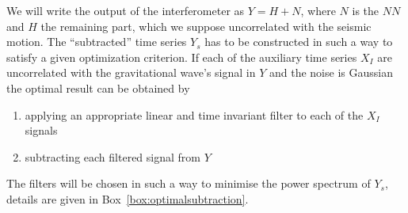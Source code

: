 We will write the output of the interferometer as $Y = H + N$, where $N$ is
the $NN$ and $H$ the remaining part, which we suppose uncorrelated with the
seismic motion. The ``subtracted'' time series $Y_s$ has to be constructed in
such a way to satisfy a given optimization criterion. If each of the auxiliary
time series $X_I$ are uncorrelated with the gravitational wave's signal in $Y$
and the noise is Gaussian the optimal result can be obtained by
\begin{enumerate}
\item applying an appropriate linear and time invariant filter to each of the
$X_I$ signals
\item subtracting each filtered signal from $Y$
\end{enumerate}
The filters will be chosen in such a way to minimise the power spectrum of
$Y_s$, details are given in Box~\ref{box:optimalsubtraction}.

